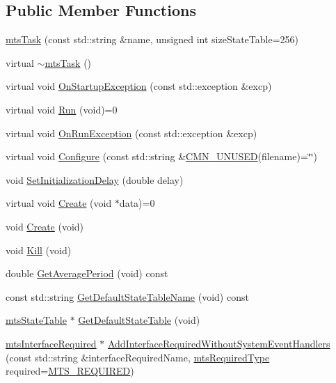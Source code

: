 \subsection*{Public Member Functions}
\begin{DoxyCompactItemize}
\item 
\hyperlink{classmts_task_a984edec80b837edc155eebc67092faf0}{mts\+Task} (const std\+::string \&name, unsigned int size\+State\+Table=256)
\item 
virtual \hyperlink{classmts_task_a7a3b50f50f6763c1c0bc5891ec51e32f}{$\sim$mts\+Task} ()
\item 
virtual void \hyperlink{classmts_task_aa600105632635600a684541c06a2924b}{On\+Startup\+Exception} (const std\+::exception \&excp)
\item 
virtual void \hyperlink{classmts_task_a20e18c9479cb650792456c32ee689834}{Run} (void)=0
\item 
virtual void \hyperlink{classmts_task_a58a8ec774820a2e527cf6f5ecdca5842}{On\+Run\+Exception} (const std\+::exception \&excp)
\item 
virtual void \hyperlink{classmts_task_a52c822f34f12a0eb14f3d02de9ddd6f6}{Configure} (const std\+::string \&\hyperlink{cmn_portability_8h_a021894e2626935fa2305434b1e893ff6}{C\+M\+N\+\_\+\+U\+N\+U\+S\+E\+D}(filename)=\char`\"{}\char`\"{})
\item 
void \hyperlink{classmts_task_ae1ddab5da6257ef89e546ef45a651d6b}{Set\+Initialization\+Delay} (double delay)
\item 
virtual void \hyperlink{classmts_task_aa051581f8b5c35105d595d7a46ccbe17}{Create} (void $\ast$data)=0
\item 
void \hyperlink{classmts_task_abc1a625d025c1038fa48137f0ba53465}{Create} (void)
\item 
void \hyperlink{classmts_task_a67a15d7fffef28708b813e2ea624e4f8}{Kill} (void)
\item 
double \hyperlink{classmts_task_ad3536c42140e452a4deb6b5a6f7bf629}{Get\+Average\+Period} (void) const 
\item 
const std\+::string \hyperlink{classmts_task_a46a4b088bfae45d795d3c3408db95b96}{Get\+Default\+State\+Table\+Name} (void) const 
\item 
\hyperlink{classmts_state_table}{mts\+State\+Table} $\ast$ \hyperlink{classmts_task_ad36b9bceda5769e3552769c0047a7bf9}{Get\+Default\+State\+Table} (void)
\item 
\hyperlink{classmts_interface_required}{mts\+Interface\+Required} $\ast$ \hyperlink{classmts_task_a00af25054306741c82c9b3ea2b234cce}{Add\+Interface\+Required\+Without\+System\+Event\+Handlers} (const std\+::string \&interface\+Required\+Name, \hyperlink{mts_forward_declarations_8h_a9ef1ce54724afde7802db326ff8606f3}{mts\+Required\+Type} required=\hyperlink{mts_forward_declarations_8h_a9ef1ce54724afde7802db326ff8606f3ae01fd85391b60e546bbb1be9716c4ec9}{M\+T\+S\+\_\+\+R\+E\+Q\+U\+I\+R\+E\+D})

\end{DoxyCompactItemize}

